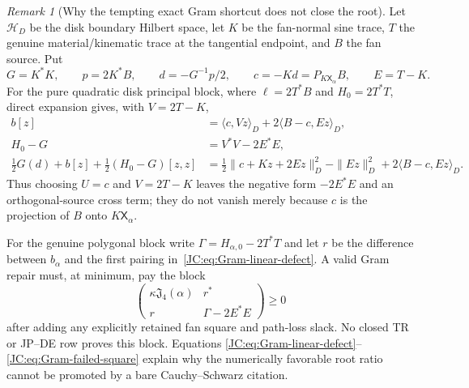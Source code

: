 \documentclass[11pt]{amsart}
\numberwithin{equation}{section}
\theoremstyle{definition}
\theoremstyle{remark}
\newtheorem{remark}[theorem]{Remark}
\newcommand{\Jfour}{\mathfrak J_4}
\begin{document}
\begin{remark}[Why the tempting exact Gram shortcut does not close the root]
Let $\mathcal H_D$ be the disk boundary Hilbert space, let $K$ be the
fan-normal sine trace, $T$ the genuine material/kinematic trace at the
tangential endpoint, and $B$ the fan source.  Put
\[
 G=K^*K,\qquad p=2K^*B,\qquad
 d=-G^{-1}p/2,\qquad c=-Kd=P_{K\mathsf X_\alpha}B,
 \qquad E=T-K.
\]
For the pure quadratic disk principal block, where
$\ell=2T^*B$ and $H_0=2T^*T$, direct expansion gives, with $V=2T-K$,
\begin{align}
 b[z]&=\langle c,Vz\rangle_D
       +2\langle B-c,Ez\rangle_D,
 \label{JC:eq:Gram-linear-defect}\\
 H_0-G&=V^*V-2E^*E,
 \label{JC:eq:Gram-quadratic-defect}\\
 \frac12G(d)+b[z]+\frac12(H_0-G)[z,z]
 &=\frac12\|c+Kz+2Ez\|_D^2-
   \|Ez\|_D^2+2\langle B-c,Ez\rangle_D.
 \label{JC:eq:Gram-failed-square}
\end{align}
Thus choosing $U=c$ and $V=2T-K$ leaves the negative form $-2E^*E$
and an orthogonal-source cross term; they do not vanish merely because
$c$ is the projection of $B$ onto $K\mathsf X_\alpha$.

For the genuine polygonal block write
$\Gamma=H_{\alpha,0}-2T^*T$ and let $r$ be the difference between
$b_\alpha$ and the first pairing in~\eqref{JC:eq:Gram-linear-defect}.  A
valid Gram repair must, at minimum, pay the block
\[
 \begin{pmatrix}
  \kappa\Jfour(\alpha) & r^*\\ r & \Gamma-2E^*E
 \end{pmatrix}
 \ge0
\]
after adding any explicitly retained fan square and path-loss slack.
No closed TR or JP--DE row proves this block.  Equations
\eqref{JC:eq:Gram-linear-defect}--\eqref{JC:eq:Gram-failed-square} explain why
the numerically favorable root ratio cannot be promoted by a bare
Cauchy--Schwarz citation.
\end{remark}
\end{document}
